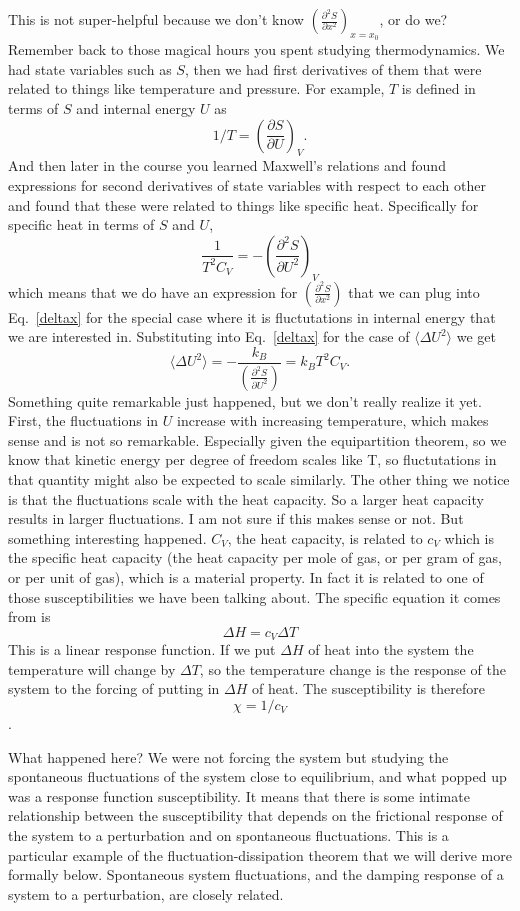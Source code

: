\documentclass[]{revtex4}
\newcommand{\sm}[1]{{\[#1\]}}
\begin{document}
This is not super-helpful because we don't know $\left(\frac{\partial^2 S}{\partial x^2}\right)_{x=x_0}$, or do we?
Remember back to those magical hours you spent studying thermodynamics.  We had state variables such as $S$, then
we had first derivatives of them that were related to things like temperature and pressure.  For example,
$T$ is defined in terms of $S$ and internal energy $U$ as
\sm{1/T = \left(\frac{\partial S}{\partial U}\right)_V.}
And then later in the course you learned Maxwell's relations and found expressions for second derivatives of state variables
with respect to each other and found that these were related to things like specific heat.  Specifically for specific heat
in terms of $S$ and $U$,
\sm{\frac{1}{T^2C_V} = - \left(\frac{\partial^2 S}{\partial U^2}\right)_V}
which means that we do have an expression for $\left(\frac{\partial^2 S}{\partial x^2}\right)$ that we can plug into Eq.~\ref{deltax}
for the special case where it is fluctutations in internal energy that we are interested in.  Substituting into Eq.~\ref{deltax}
for the case of $\langle \Delta U^2\rangle$ we get
\sm{\langle \Delta U^2\rangle=-\frac{k_B}{\left(\frac{\partial^2 S}{\partial U^2}\right)}=k_BT^2C_V.}
Something quite remarkable just happened, but we don't really realize it yet.  First, the fluctuations in $U$ increase with increasing
temperature, which makes sense and is not so remarkable.  Especially given the equipartition theorem, so we know that kinetic energy per
degree of freedom scales like T, so fluctutations in that quantity might also be expected to scale similarly.  The other thing
we notice is that the fluctuations scale with the heat capacity.  So a larger heat capacity results in larger fluctuations.  I am not
sure if this makes sense or not.  But something interesting happened.  $C_V$, the heat capacity, is related to $c_V$ which is the specific
heat capacity (the heat capacity per mole of gas, or per gram of gas, or per unit of gas), which is a material property.  In fact it is
related to one of those susceptibilities we have been talking about. The specific equation it comes from is
\sm{\Delta H = c_V\Delta T}
This is a linear response function.  If we put $\Delta H$ of heat into the system the temperature will change by $\Delta T$, so the temperature
change is the response of the system to the forcing of putting in $\Delta H$ of heat.  The susceptibility is therefore
\sm{\chi = 1/c_V}.

What happened here?  We were not forcing the system but studying the spontaneous fluctuations of the system close to equilibrium,
and what popped up was a response function susceptibility.  It means that there is some intimate relationship between the susceptibility
that depends on the frictional response of the system to a perturbation and on spontaneous fluctuations.  This is a particular example
of the fluctuation-dissipation theorem that we will derive more formally below.  Spontaneous system fluctuations, and the damping response of a system
to a perturbation, are closely related.
\end{document}
